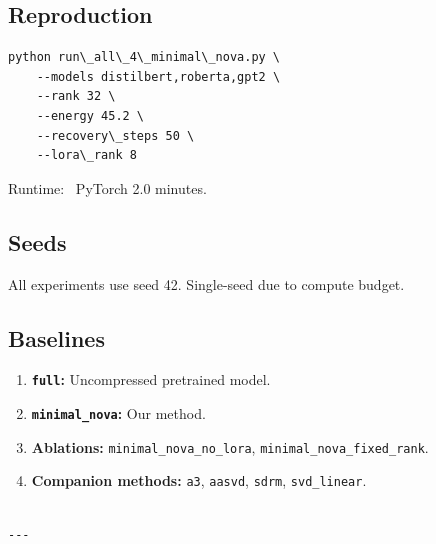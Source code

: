 \subsection{Reproduction}

\begin{lstlisting}
python run\_all\_4\_minimal\_nova.py \
    --models distilbert,roberta,gpt2 \
    --rank 32 \
    --energy 45.2 \
    --recovery\_steps 50 \
    --lora\_rank 8
\end{lstlisting}

Runtime: ~PyTorch 2.0 minutes.

\subsection{Seeds}

All experiments use seed 42. Single-seed due to compute budget.

\subsection{Baselines}

\begin{enumerate}
\item \textbf{\texttt{full}:} Uncompressed pretrained model.
\item \textbf{\texttt{minimal\_nova}:} Our method.
\item \textbf{Ablations:} \texttt{minimal\_nova\_no\_lora}, \texttt{minimal\_nova\_fixed\_rank}.
\item \textbf{Companion methods:} \texttt{a3}, \texttt{aasvd}, \texttt{sdrm}, \texttt{svd\_linear}.
\end{enumerate}
\begin{lstlisting}

---
\end{lstlisting}